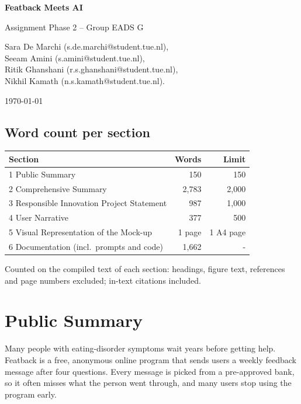 \documentclass[a4paper]{article}
\begin{document}
\thispagestyle{empty}

\vspace*{\fill}
\begin{center}

{\Huge\bfseries Featback Meets AI\par}

\vspace{0.8em}
{\LARGE Assignment Phase 2 -- Group EADS G\par}

\vspace{1.5em}
{\large Sara De Marchi (s.de.marchi@student.tue.nl),\\
Seeam Amini (s.amini@student.tue.nl),\\
Ritik Ghanshani (r.s.ghanshani@student.tue.nl),\\
Nikhil Kamath (n.s.kamath@student.tue.nl).\par}

\today
\end{center}
\vspace*{\fill}

\newpage

\tableofcontents

\vspace{3.5em}
\subsection*{Word count per section}
\begin{tabularx}{\textwidth}{@{}Xrr@{}}
\toprule
Section & Words & Limit \\
\midrule
1 Public Summary & 150 & 150 \\
2 Comprehensive Summary & 2,783 & 2,000 \\
3 Responsible Innovation Project Statement & 987 & 1,000 \\
4 User Narrative & 377 & 500 \\
5 Visual Representation of the Mock-up & 1 page & 1 A4 page \\
6 Documentation (incl.\ prompts and code) & 1,662 & - \\
\bottomrule
\end{tabularx}

\smallskip
\small Counted on the compiled text of each section: headings, figure text, references and page numbers excluded; in-text citations included.
\normalsize

\newpage

\section{Public Summary} %
Many people with eating-disorder symptoms wait years before getting help. Featback is a free, anonymous online program that sends users a weekly feedback message after four questions. Every message is picked from a pre-approved bank, so it often misses what the person went through, and many users stop using the program early.
\end{document}
